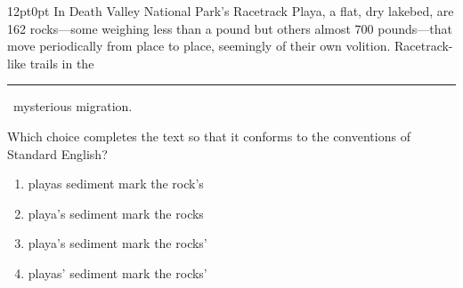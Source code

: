 \documentclass[11pt, twocolumn]{article}
\newcounter{questionnum}
\begin{document}
\vspace{6pt}\noindent
\begin{minipage}{\columnwidth}\raggedright
\noindent{}\par\vspace{8pt}
\begin{adjustwidth}{12pt}{0pt}
In Death Valley National Park's Racetrack Playa, a flat, dry lakebed, are 162 rocks---some weighing less than a pound but others almost 700 pounds---that move periodically from place to place, seemingly of their own volition. Racetrack-like trails in the \,\rule{2cm}{0.4pt}\, mysterious migration.
\vspace{6pt}

Which choice completes the text so that it conforms to the conventions of Standard English?
\begin{enumerate}[label=\Alph*),leftmargin=18pt,topsep=3pt,itemsep=2pt]
  \item playas sediment mark the rock's
  \item playa's sediment mark the rocks
  \item playa's sediment mark the rocks'
  \item playas' sediment mark the rocks'
\end{enumerate}
\end{adjustwidth}
\end{minipage}\par
\end{document}

